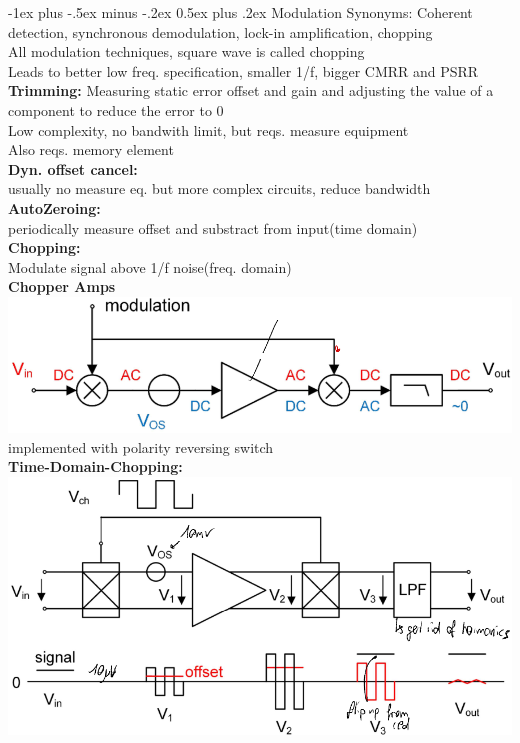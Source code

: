 \documentclass[5pt]{article}
\makeatletter
\renewcommand{\section}{\@startsection{section}{1}{0mm}%
                                {-1ex plus -.5ex minus -.2ex}%
                                {0.5ex plus .2ex}%
                                {\normalfont\large\bfseries}}
\makeatother
\begin{document}
\begin{multicols*}{4}
\section{Modulation}
Synonyms: Coherent detection, synchronous demodulation, lock-in amplification, chopping\\
All modulation techniques, square wave is called chopping\\
Leads to better low freq. specification, smaller 1/f, bigger CMRR and PSRR\\
\textbf{Trimming:} Measuring static error offset and gain and adjusting the value of a component to reduce the error to 0\\
Low complexity, no bandwith limit, but reqs. measure equipment\\
Also reqs. memory element\\
\textbf{Dyn. offset cancel:}\\
usually no measure eq. but more complex circuits, reduce bandwidth\\
\textbf{AutoZeroing:}\\
periodically measure offset and substract from input(time domain)\\
\textbf{Chopping:}\\
Modulate signal above 1/f noise(freq. domain)\\
\textbf{Chopper Amps}\\
\includegraphics[width=\columnwidth]{images/chop_amp.png}\\
implemented with polarity reversing switch\\
\textbf{Time-Domain-Chopping:}\\
\includegraphics[width=\columnwidth]{images/time_domain_chopping.png}\\

\end{multicols*}
\end{document}
